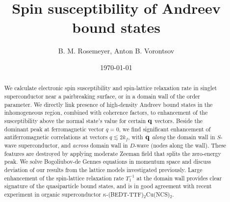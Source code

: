 \documentclass[prb,aps,showpacs,amsmath,twocolumn,10pt]{revtex4-1}
\newcommand{\blue}{\textcolor{blue}}
\newcommand{\kbtf}{$\kappa$-(BEDT-TTF)$_2$Cu(NCS)$_2$}
\begin{document}
\title{Spin susceptibility of Andreev bound states} 

\author{B. M. Rosemeyer, Anton B. Vorontsov}

\date{\today}

\begin{abstract}
%
We calculate electronic spin susceptibility and spin-lattice relaxation rate 
in singlet superconductor near a pairbreaking surface, or in a domain wall of the order parameter. 
We directly link presence of high-density Andreev bound states in the inhomogeneous region, combined with coherence factors, 
to enhancement of the susceptibility above the normal state's value for certain ${\bf q}$ vectors.  
Beside the dominant peak at ferromagnetic vector $q=0$, we find significant enhancement of 
antiferromagnetic correlations at vectors $q\lesssim 2 k_f$, 
with ${\bf q}$ \emph{along} the domain wall in $S$-wave superconductor, 
and \emph{across} domain wall in $D$-wave (nodes along the wall). 
These features are destroyed by applying moderate Zeeman field that splits the zero-energy peak. 
We solve Bogoliubov-de Gennes equations in momentum space and 
discuss deviation of our results from the lattice models investigated previously. 
Large enhancement of the spin-lattice relaxation rate $T_1^{-1}$ at the domain wall 
provides clear signature of the quasiparticle bound states, 
and is in good agreement with recent experiment in organic superconductor \kbtf. 
\end{abstract} 

\end{document}
